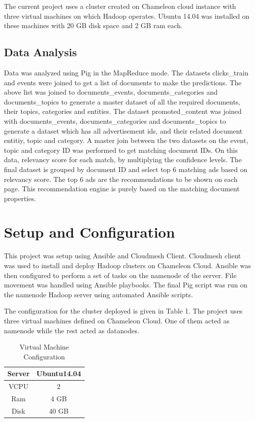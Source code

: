 \documentclass[9pt,twocolumn,twoside]{../../styles/osajnl}
\begin{document}
The current project uses a cluster created on Chameleon cloud instance with three virtual machines on which Hadoop operates. Ubuntu 14.04 was installed on these machines with 20 GB disk space and 2 GB ram each.

\subsection{Data Analysis}
Data was analyzed using Pig in the MapReduce mode. The datasets clicks\_train and events were joined to get a list of documents to make the predictions. The above list was joined to documents\_events, documents\_categories and documents\_topics to generate a master dataset of all the required documents, their topics, categories and entities. The dataset promoted\_content was joined with documents\_events, documents\_categories and documents\_topics to generate a dataset which has all advertisement ids, and their related document entitiy, topic and category. A master join between the two datasets on the event, topic and category ID was performed to get matching document IDs. On this data, relevancy score for each match, by multiplying the confidence levels. The final dataset is grouped by document ID and select top 6 matching ads based on relevancy score. The top 6 ads are the recommendations to be shown on each page. This recommendation engine is purely based on the matching document properties.

\section{Setup and Configuration}
This project was setup using Ansible and Cloudmesh Client. Cloudmesh client was used to install and deploy Hadoop clusters on Chameleon Cloud. Ansible was then configured to perform a set of tasks on the namenode of the server. File movement was handled using Ansible playbooks. The final Pig script was run on the namenode Hadoop server using automated Ansible scripts.

The configuration for the cluster deployed is given in Table 1. The project uses three virtual machines defined on Chameleon Cloud. One of them acted as namenode while the rest acted as datanodes. 

\begin{table}
\begin{tabular}{|c|c|}
\hline
    Server & Ubuntu14.04 \\ \hline
    VCPU & 2 \\\hline
    Ram & 4 GB \\\hline
    Disk & 40 GB\\\hline
\end{tabular}
\caption{Virtual Machine Configuration}
\end{table}
\end{document}
